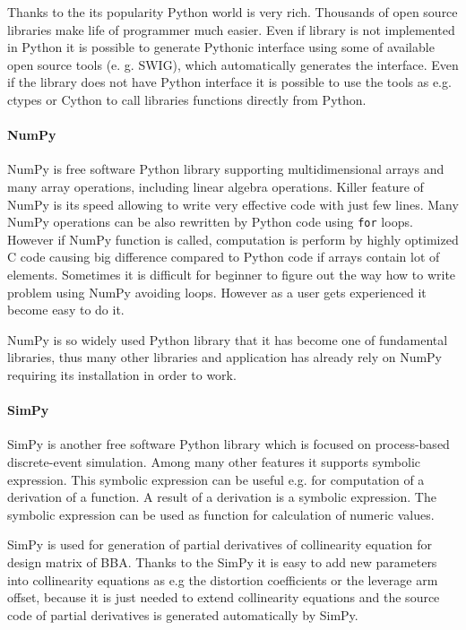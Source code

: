 \documentclass[a4paper,12pt]{article}
\begin{document}

Thanks to the its popularity Python world is very rich. 
Thousands of open source libraries make life of programmer much easier. Even 
if library is not implemented in Python it is possible to generate Pythonic 
interface using some of available open source tools (e. g. SWIG), which automatically
generates the interface. Even if the library does not have Python interface it 
is possible to use the tools as e.g. ctypes or Cython to call libraries functions directly from Python.

\paragraph{NumPy}


NumPy is free software Python library supporting multidimensional arrays and many array operations, 
including linear algebra operations. Killer feature of NumPy is its speed
 allowing to write very effective code with just few lines. Many  NumPy operations can be
also rewritten by Python code using  {\tt for} loops. However if NumPy function is called,
computation is perform by highly optimized C code causing big difference compared 
to Python code if arrays contain 
lot of elements. Sometimes it is difficult for beginner to figure out the way how 
to write problem using NumPy avoiding loops. However as a user gets experienced 
it become easy to do it. 

NumPy is so widely used Python library that it has become one of fundamental libraries, thus many
other libraries and application has already rely on NumPy requiring its installation in order to work.

\paragraph{SimPy}

SimPy is another free software Python library which is focused on process-based discrete-event simulation.
Among many other features it supports symbolic expression. This symbolic expression can be useful
e.g. for computation of a derivation of a function. A result of a derivation is a symbolic expression.
The symbolic expression can be used as function for calculation of numeric values. 

SimPy is used for generation of partial derivatives of collinearity equation for design matrix 
of BBA. Thanks to the SimPy 
it is easy to add new parameters into collinearity equations as e.g the distortion coefficients or the leverage arm offset,
because it is just needed to extend collinearity equations and the source code of partial derivatives 
is generated automatically by SimPy. 
\end{document}
